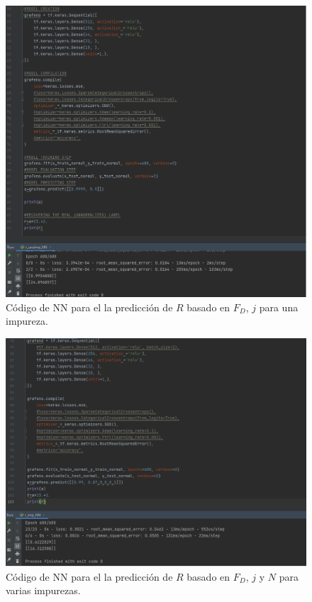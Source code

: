 \documentclass{article}
\begin{document}
\begin{figure}[th!]
\centering
   \includegraphics[width=1.\textwidth]{unaImp_NN.png}
   \caption{Código de NN para el la predicción de $R$ basado en $F_D$, $j$ para una impureza.}
\end{figure}
\begin{figure}[th!]
\centering
   \includegraphics[width=1.\textwidth]{r_Varias.png}
   \caption{Código de NN para el la predicción de $R$ basado en $F_D$, $j$ y $N$ para varias impurezas.}
\end{figure}
\end{document}
